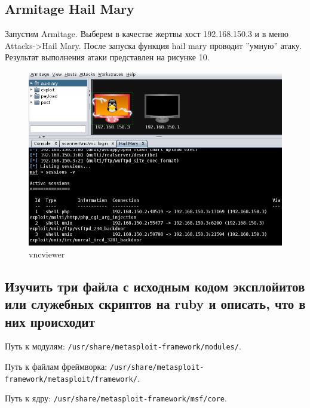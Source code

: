 \documentclass[11pt, a4paper]{article}		%
\begin{document}

\subsection{Armitage Hail Mary}

Запустим Armitage. Выберем в качестве жертвы хост 192.168.150.3 и в меню Attacks->Hail Mary. После запуска функция hail mary проводит ”умную” атаку. Результат выполнения атаки представлен на рисунке 10.

\begin{figure}[h!]
\centering
\includegraphics[scale=0.8]{res/hailm}
\caption{vncviewer}
\end{figure}




\subsection{Изучить три файла с исходным кодом эксплойитов или служебных скриптов на ruby и описать, что в них происходит}

Путь к модулям: \verb'/usr/share/metasploit-framework/modules/'.

Путь к файлам фреймворка: \verb'/usr/share/metasploit-framework/metasploit/framework/'.

Путь к ядру: \verb'/usr/share/metasploit-framework/msf/core'.
\end{document}
